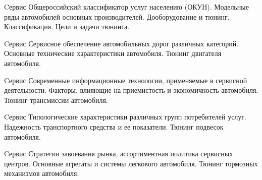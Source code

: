 \documentclass[
	11pt,
	a4paper,
	]
	{article}
\begin{document}
\setlength{\miniH}{82mm}

	

\begin{minipage}[t][\miniH]{\miniL}\centering
	 {Cервис}
		{
			Общероссийский классификатор услуг населению (ОКУН).
		}{
			Модельные ряды автомобилей основных производителей.
		}{
			Дооборудование и тюнинг. Классификация. Цели и задачи тюнинга.
		}
	\lowGE
\end{minipage}

\vfill



\begin{minipage}[t][\miniH]{\miniL}\centering
	 {Cервис}
		{
			Сервисное обеспечение автомобильных дорог различных категорий.
		}{
			Основные технические характеристики автомобиля.
		}{
			Тюнинг двигателя автомобиля.
		}
	\lowGE
\end{minipage}

\vfill



\begin{minipage}[t][\miniH]{\miniL}\centering
	 {Cервис}
		{
			Современные информационные технологии, применяемые в сервисной деятельности.
		}{
			Факторы, влияющие на приемистость и экономичность автомобиля.
		}{
			Тюнинг трансмиссии автомобиля.
		}
	\lowGE
\end{minipage}





\begin{minipage}[t][\miniH]{\miniL}\centering
	 {Cервис}
		{
			Типологические характеристики различных групп потребителей услуг.
		}{
			Надежность транспортного средства и ее показатели.
		}{
			Тюнинг подвесок автомобиля.
		}
	\lowGE
\end{minipage}

\vfill



\begin{minipage}[t][\miniH]{\miniL}\centering
	 {Cервис}
		{
			Стратегии завоевания рынка, ассортиментная политика сервисных центров.
		}{
			Основные агрегаты и системы легкового автомобиля.
		}{
			Тюнинг тормозных механизмов автомобиля.
		}
	\lowGE
\end{minipage}

\vfill
\end{document}
